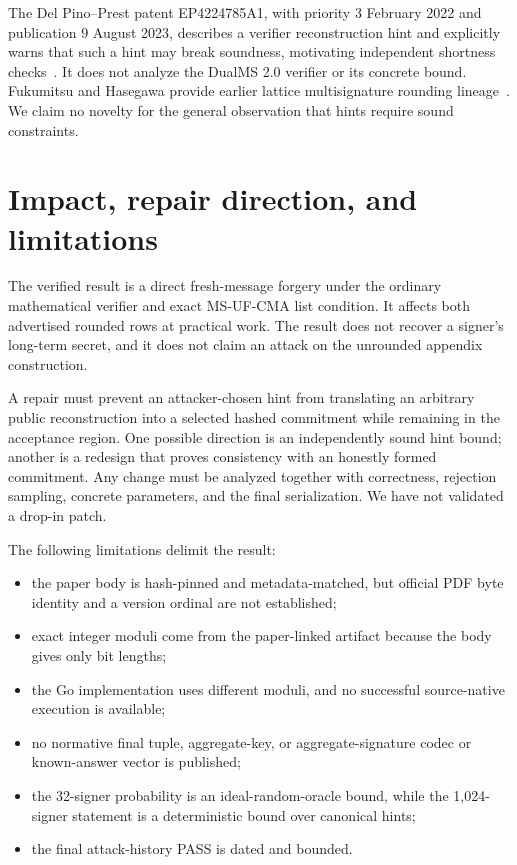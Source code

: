 \documentclass[10pt,a4paper]{article}
\begin{document}
The Del Pino--Prest patent EP4224785A1, with priority 3 February 2022 and
publication 9 August 2023, describes a verifier reconstruction hint and
explicitly warns that such a hint may break soundness, motivating independent
shortness checks~\cite{hintpatent}. It does not analyze the DualMS 2.0 verifier
or its concrete bound. Fukumitsu and Hasegawa provide earlier lattice
multisignature rounding lineage~\cite{fukumitsu}. We claim no novelty for the
general observation that hints require sound constraints.

\section{Impact, repair direction, and limitations}

The verified result is a direct fresh-message forgery under the ordinary
mathematical verifier and exact MS-UF-CMA list condition. It affects both
advertised rounded rows at practical work. The result does not recover a
signer's long-term secret, and it does not claim an attack on the unrounded
appendix construction.

A repair must prevent an attacker-chosen hint from translating an arbitrary
public reconstruction into a selected hashed commitment while remaining in
the acceptance region. One possible direction is an independently sound hint
bound; another is a redesign that proves consistency with an honestly formed
commitment. Any change must be analyzed together with correctness, rejection
sampling, concrete parameters, and the final serialization. We have not
validated a drop-in patch.

The following limitations delimit the result:
\begin{itemize}
  \item the paper body is hash-pinned and metadata-matched, but official PDF
        byte identity and a version ordinal are not established;
  \item exact integer moduli come from the paper-linked artifact because the
        body gives only bit lengths;
  \item the Go implementation uses different moduli, and no successful
        source-native execution is available;
  \item no normative final tuple, aggregate-key, or aggregate-signature codec
        or known-answer vector is published;
  \item the 32-signer probability is an ideal-random-oracle bound, while the
        1,024-signer statement is a deterministic bound over canonical hints;
  \item the final attack-history PASS is dated and bounded.
\end{itemize}
\end{document}
